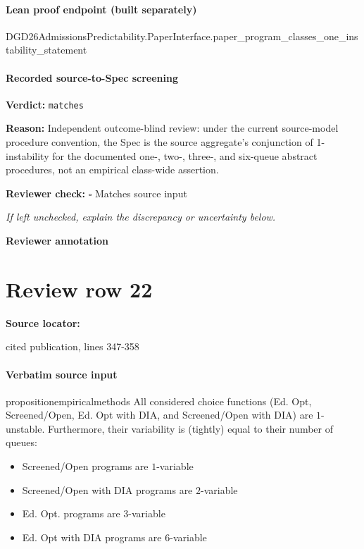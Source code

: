 \documentclass[10pt]{article}
\newcommand{\reviewerbox}{%
  \par\noindent\fbox{\parbox{0.96\linewidth}{\rule{0pt}{0.38in}}}\par
}
\newcommand{\reviewmatch}[1]{%
  \par\noindent\textbf{Reviewer check:} $\square$\; #1\par
  \noindent\emph{If left unchecked, explain the discrepancy or uncertainty below.}\par
}
\begin{document}
\paragraph{Lean proof endpoint (built separately)}\begin{ReviewVerbatim}
DGD26AdmissionsPredictability.PaperInterface.paper_program_classes_one_instability_statement
\end{ReviewVerbatim}

\paragraph{Recorded source-to-Spec screening}
\textbf{Verdict:} \texttt{matches}
\\
{\raggedright
\textbf{Reason:} Independent outcome-\allowbreak{}blind review:\allowbreak{} under the current source-\allowbreak{}model procedure convention, the Spec is the source aggregate's conjunction of 1-\allowbreak{}instability for the documented one-\allowbreak{}, two-\allowbreak{}, three-\allowbreak{}, and six-\allowbreak{}queue abstract procedures, not an empirical class-\allowbreak{}wide assertion.\allowbreak{}
\par}
\reviewmatch{Matches source input}
\noindent\textbf{Reviewer annotation}\par
\reviewerbox
\clearpage
\hypertarget{source-claim-f595f3e6af0e1b40}{}
\section*{Review row 22}
\textbf{Source locator:} {\footnotesize\raggedright cited publication, lines 347-\allowbreak{}358\par}
\paragraph{Verbatim source input}
\begin{ReviewVerbatim}
\begin{restatable}[]{proposition}{empiricalmethods}
\label{prop:program-variability}
All considered choice functions ({Ed. Opt}, {Screened/Open}, {Ed. Opt with DIA}, and {Screened/Open with DIA}) are $1$-unstable. Furthermore, their variability is (tightly) equal to their number of queues:

\begin{itemize}[noitemsep,topsep=0pt,parsep=0pt,partopsep=0pt]
    \item Screened/Open programs are $1$-variable
    \item Screened/Open with DIA programs are $2$-variable
    \item Ed. Opt. programs are $3$-variable
    \item Ed. Opt with DIA programs are $6$-variable
\end{itemize}

\end{restatable}
\end{ReviewVerbatim}
\end{document}
